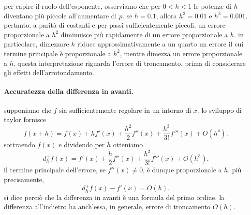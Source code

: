 per capire il ruolo dell'esponente, osserviamo che per $0<h<1$ le potenze di $h$ diventano più piccole all'aumentare di $p$. se $h=0.1$, allora $h^2=0.01$ e $h^3=0.001$. pertanto, a parità di costanti e per passi sufficientemente piccoli, un errore proporzionale a $h^2$ diminuisce più rapidamente di un errore proporzionale a $h$. in particolare, dimezzare $h$ riduce approssimativamente a un quarto un errore il cui termine principale è proporzionale a $h^2$, mentre dimezza un errore proporzionale a $h$. questa interpretazione riguarda l'errore di troncamento, prima di considerare gli effetti dell'arrotondamento.

\paragraph{Accuratezza della differenza in avanti.}
supponiamo che $f$ sia sufficientemente regolare in un intorno di $x$. lo sviluppo di taylor fornisce
\begin{equation*}
 f(x+h)=f(x)+hf'(x)+\frac{h^2}{2}f''(x)
 +\frac{h^3}{3!}f'''(x)+O(h^4).
 \label{eq:taylor_avanti}
\end{equation*}
sottraendo $f(x)$ e dividendo per $h$ otteniamo
\begin{equation*}
 d_h^+f(x)=f'(x)+\frac{h}{2}f''(x)
 +\frac{h^2}{3!}f'''(x)+O(h^3).
 \label{eq:errore_avanti}
\end{equation*}
il termine principale dell'errore, se $f''(x)\neq0$, è dunque proporzionale a $h$. più precisamente,
\begin{equation*}
 d_h^+f(x)-f'(x)=O(h).
 \label{eq:ordine_avanti}
\end{equation*}
si dice perciò che la differenza in avanti è una formula del primo ordine. la differenza all'indietro ha anch'essa, in generale, errore di troncamento $O(h)$.

